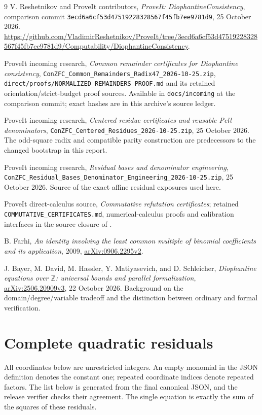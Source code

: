 \documentclass[11pt]{article}
\theoremstyle{definition}
\newcommand{\Z}{\mathbb Z}
\begin{document}
\begingroup
\raggedright
\begin{thebibliography}{9}
 V. Reshetnikov and ProveIt contributors,
\emph{ProveIt: DiophantineConsistency}, comparison commit
\texttt{3ecd6a6cf53d47519228328567f45fb7ee9781d9}, 25 October 2026.
\url{https://github.com/VladimirReshetnikov/ProveIt/tree/3ecd6a6cf53d47519228328567f45fb7ee9781d9/Computability/DiophantineConsistency}.

 ProveIt incoming research,
\emph{Common remainder certificates for Diophantine consistency},
\nolinkurl{ConZFC_Common_Remainders_Radix47_2026-10-25.zip},
\nolinkurl{direct/proofs/NORMALIZED_REMAINDERS_PROOF.md} and its retained
orientation/strict-budget proof sources. Available in \texttt{docs/incoming}
at the comparison commit; exact hashes are in this archive's source ledger.

 ProveIt incoming research,
\emph{Centered residue certificates and reusable Pell denominators},
\nolinkurl{ConZFC_Centered_Residues_2026-10-25.zip}, 25 October 2026.
The odd-square radix and compatible parity construction are predecessors
to the changed bootstrap in this report.

 ProveIt incoming research,
\emph{Residual bases and denominator engineering},
\nolinkurl{ConZFC_Residual_Bases_Denominator_Engineering_2026-10-25.zip},
25 October 2026. Source of the exact affine residual exposures used here.

 ProveIt direct-calculus source,
\emph{Commutative refutation certificates}; retained
\nolinkurl{COMMUTATIVE_CERTIFICATES.md}, numerical-calculus proofs and
calibration interfaces in the source closure of \cite{common}.

 B. Farhi, \emph{An identity involving the least common
multiple of binomial coefficients and its application}, 2009,
\href{https://arxiv.org/abs/0906.2295}{arXiv:0906.2295v2}.

 J. Bayer, M. David, M. Hassler, Y. Matiyasevich,
and D. Schleicher, \emph{Diophantine equations over $\Z$: universal bounds
and parallel formalization},
\href{https://arxiv.org/abs/2506.20909}{arXiv:2506.20909v3},
22 October 2026. Background on the domain/degree/variable tradeoff and the
distinction between ordinary and formal verification.
\end{thebibliography}
\endgroup

\appendix
\section{Complete quadratic residuals}\label{sec:residuals}

All coordinates below are unrestricted integers. An empty monomial in the
JSON definition denotes the constant one; repeated coordinate indices
denote repeated factors. The list below is generated from the final
canonical JSON, and the release verifier checks their agreement. The
single equation is exactly the sum of the squares of these residuals.


\end{document}
